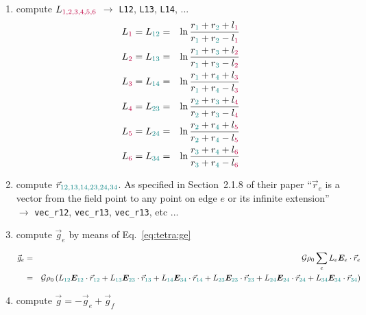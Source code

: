 \begin{enumerate}
\item compute $L_{\color{purple}1,2,3,4,5,6}$ $\rightarrow$ \verb|L12|, \verb|L13|, \verb|L14|, ...
\begin{eqnarray}
L_{\color{purple}1} = L_{\color{teal}12} 
&=& \ln \frac{r_{\color{teal}1}+r_{\color{teal}2}+l_{\color{purple}1}}{r_{\color{teal}1}+r_{\color{teal}2}-l_{\color{purple}1}} \nonumber\\
L_{\color{purple}2} = L_{\color{teal}13} 
&=& \ln \frac{r_{\color{teal}1}+r_{\color{teal}3}+l_{\color{purple}2}}{r_{\color{teal}1}+r_{\color{teal}3}-l_{\color{purple}2}} \nonumber\\
L_{\color{purple}3} = L_{\color{teal}14} 
&=& \ln \frac{r_{\color{teal}1}+r_{\color{teal}4}+l_{\color{purple}3}}{r_{\color{teal}1}+r_{\color{teal}4}-l_{\color{purple}3}} \nonumber\\
L_{\color{purple}4} = L_{\color{teal}23} 
&=& \ln \frac{r_{\color{teal}2}+r_{\color{teal}3}+l_{\color{purple}4}}{r_{\color{teal}2}+r_{\color{teal}3}-l_{\color{purple}4}} \nonumber\\
L_{\color{purple}5} = L_{\color{teal}24} 
&=& \ln \frac{r_{\color{teal}2}+r_{\color{teal}4}+l_{\color{purple}5}}{r_{\color{teal}2}+r_{\color{teal}4}-l_{\color{purple}5}} \nonumber\\
L_{\color{purple}6} = L_{\color{teal}34} 
&=& \ln \frac{r_{\color{teal}3}+r_{\color{teal}4}+l_{\color{purple}6}}{r_{\color{teal}3}+r_{\color{teal}4}-l_{\color{purple}6}} \nonumber
\end{eqnarray}


\item compute $\vec{r}_{\color{teal}12,13,14,23,24,34}$. As specified in Section~2.1.8 of their 
paper ``$\vec{r}_e$ is a vector from the field point to any point on edge $e$ or its infinite extension''
$\rightarrow$ \verb|vec_r12|, \verb|vec_r13|, \verb|vec_r13|, etc ...  


\item compute $\vec{g}_e$ by means of Eq.~\eqref{eq:tetra:ge}

\begin{eqnarray}
\vec{g}_e 
&=&{\cal G} \rho_0 \sum_e L_e {\bm E}_e \cdot \vec{r}_e \nonumber\\
&=&{\cal G} \rho_0 \left( 
L_{\color{teal}12} {\bm E}_{\color{teal}12}\cdot\vec{r}_{\color{teal}12} +
L_{\color{teal}13} {\bm E}_{\color{teal}23}\cdot\vec{r}_{\color{teal}13} +
L_{\color{teal}14} {\bm E}_{\color{teal}34}\cdot\vec{r}_{\color{teal}14} +
L_{\color{teal}23} {\bm E}_{\color{teal}23}\cdot\vec{r}_{\color{teal}23} + 
L_{\color{teal}24} {\bm E}_{\color{teal}24}\cdot\vec{r}_{\color{teal}24} +
L_{\color{teal}34} {\bm E}_{\color{teal}34}\cdot\vec{r}_{\color{teal}34} 
\right)
\end{eqnarray}


\item compute $\vec{g}=-\vec{g}_e+\vec{g}_f$

\end{enumerate}

